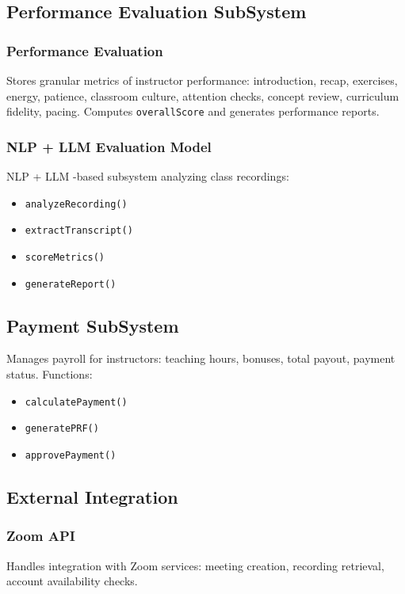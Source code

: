 \subsection{Performance Evaluation SubSystem}

\subsubsection{Performance Evaluation}
Stores granular metrics of instructor performance: introduction, recap, exercises, energy, patience, classroom culture, attention checks, concept review, curriculum fidelity, pacing. Computes \texttt{overallScore} and generates performance reports.

\subsubsection{NLP + LLM Evaluation Model}
NLP + LLM -based subsystem analyzing class recordings:
\begin{itemize}
    \item \texttt{analyzeRecording()}
    \item \texttt{extractTranscript()}
    \item \texttt{scoreMetrics()}
    \item \texttt{generateReport()}
\end{itemize}

\subsection{Payment SubSystem}
Manages payroll for instructors: teaching hours, bonuses, total payout, payment status. Functions:
\begin{itemize}
    \item \texttt{calculatePayment()}
    \item \texttt{generatePRF()}
    \item \texttt{approvePayment()}
\end{itemize}

\subsection{External Integration}

\subsubsection{Zoom API}
Handles integration with Zoom services: meeting creation, recording retrieval, account availability checks.

